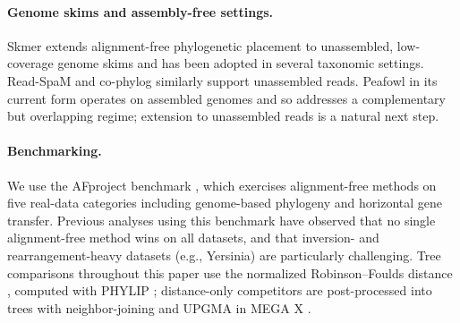 \paragraph{Genome skims and assembly-free settings.}
Skmer \citep{sarmashghi2019skmer} extends alignment-free phylogenetic
placement to unassembled, low-coverage genome skims and has been adopted in
several taxonomic settings. Read-SpaM \citep{lau2019readspam} and co-phylog
\citep{yi2013cophylog} similarly support unassembled reads. Peafowl in its
current form operates on assembled genomes and so addresses a complementary
but overlapping regime; extension to unassembled reads is a natural next
step.

\paragraph{Benchmarking.}
We use the AFproject benchmark \citep{zielezinski2019afproject}, which
exercises alignment-free methods on five real-data categories including
genome-based phylogeny and horizontal gene transfer. Previous analyses
using this benchmark have observed that no single alignment-free method
wins on all datasets, and that inversion- and rearrangement-heavy datasets
(e.g., Yersinia) are particularly challenging. Tree comparisons throughout
this paper use the normalized Robinson--Foulds distance
\citep{robinson1981rf}, computed with PHYLIP
\citep{felsenstein1989phylip}; distance-only competitors are post-processed
into trees with neighbor-joining \citep{saitou1987nj} and UPGMA
\citep{sokal1958upgma} in MEGA X \citep{kumar2018megax}.
